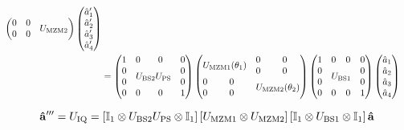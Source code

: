 \begin{equation}
\begin{split}
\begin{pmatrix}
			 0 & 0 & \multicolumn{2}{c}{\multirow{2}{*}{$U_\text{MZM2}$}} \\
			 0 & 0 & & \\
		\end{pmatrix}
		\begin{pmatrix}
			\hat{a}_1^\prime \\
			\hat{a}_2^\prime \\
			\hat{a}_3^\prime \\
			\hat{a}_4^\prime
		\end{pmatrix}
		\\
		&=
		\begin{pmatrix}
			 1 & 0 & 0 & 0 \\
			 0 & \multicolumn{2}{c}{\multirow{2}{*}{$U_\text{BS2}U_\text{PS}$}} & 0 \\
			 0 & & & 0 \\
			 0 & 0 & 0 & 1
		\end{pmatrix}
		\begin{pmatrix}
			 \multicolumn{2}{c}{\multirow{2}{*}{$U_\text{MZM1}(\theta_1)$}} & 0 & 0 \\
			 & & 0 & 0 \\
			 0 & 0 & \multicolumn{2}{c}{\multirow{2}{*}{$U_\text{MZM2}(\theta_2)$}} \\
			 0 & 0 & & \\
		\end{pmatrix}
		\begin{pmatrix}
			 1 & 0 & 0 & 0 \\
			 0 & \multicolumn{2}{c}{\multirow{2}{*}{$U_\text{BS1}$}} & 0 \\
			 0 & & & 0 \\
			 0 & 0 & 0 & 1
		\end{pmatrix}
		\begin{pmatrix}
			\hat{a}_1 \\
			\hat{a}_2 \\
			\hat{a}_3 \\
			\hat{a}_4
		\end{pmatrix}
	\end{split}
\end{equation}

\begin{equation}
	\vb{\hat{a}}^{\prime\prime\prime}
	=
	U_\text{IQ}
	=
	\left[
		\mathbb{I}_1
		\otimes
		U_\text{BS2}
		U_\text{PS}
		\otimes
		\mathbb{I}_1
	\right]
	\left[
		U_\text{MZM1}
		\otimes
		U_\text{MZM2}
	\right]
	\left[
		\mathbb{I}_1
		\otimes
		U_\text{BS1}
		\otimes
		\mathbb{I}_1
	\right]
	\vb{\hat{a}}
\end{equation}

